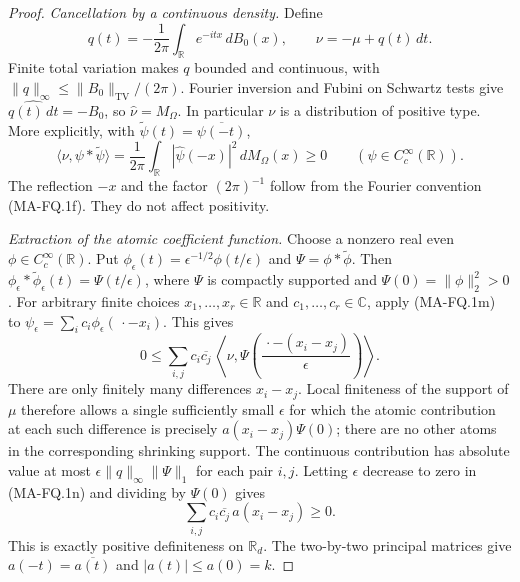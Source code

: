 \begin{proof}
\emph{Cancellation by a continuous density.}
Define
\[
 q(t)=-\frac1{2\pi}\int_{\mathbb R}e^{-itx}\,dB_0(x),
 \qquad \nu=-\mu+q(t)\,dt.
 \tag{MA-FQ.1l}
\]
Finite total variation makes $q$ bounded and continuous, with
$\|q\|_\infty\le\|B_0\|_{\mathrm{TV}}/(2\pi)$.
Fourier inversion and Fubini on Schwartz tests give
$\widehat{q(t)\,dt}=-B_0$, so
$\widehat\nu=M_\Omega$. In particular $\nu$ is a distribution
of positive type. More explicitly, with
$\widetilde\psi(t)=\overline{\psi(-t)}$,
\[
 \langle\nu,\psi*\widetilde\psi\rangle
   =\frac1{2\pi}\int_{\mathbb R}
                         |\widehat\psi(-x)|^2\,dM_\Omega(x)
   \ge0\qquad(\psi\in C_c^\infty(\mathbb R)).
 \tag{MA-FQ.1m}
\]
The reflection $-x$ and the factor $(2\pi)^{-1}$ follow from
the Fourier convention (MA-FQ.1f). They do not affect positivity.

\emph{Extraction of the atomic coefficient function.}
Choose a nonzero real even $\phi\in C_c^\infty(\mathbb R)$.
Put $\phi_\epsilon(t)=\epsilon^{-1/2}\phi(t/\epsilon)$ and
$\Psi=\phi*\widetilde\phi$. Then
$\phi_\epsilon*\widetilde\phi_\epsilon(t)=\Psi(t/\epsilon)$,
where $\Psi$ is compactly supported and
$\Psi(0)=\|\phi\|_2^2>0$. For arbitrary finite choices
$x_1,\ldots,x_r\in\mathbb R$ and $c_1,\ldots,c_r\in\mathbb C$,
apply (MA-FQ.1m) to
$\psi_\epsilon=\sum_i c_i\phi_\epsilon(\,\cdot-x_i)$.
This gives
\[
 0\le\sum_{i,j}c_i\overline{c_j}\,
 \left\langle\nu,
  \Psi\left(\frac{\,\cdot-(x_i-x_j)}\epsilon\right)
 \right\rangle.
 \tag{MA-FQ.1n}
\]
There are only finitely many differences $x_i-x_j$.
Local finiteness of the support of $\mu$ therefore allows a
single sufficiently small $\epsilon$ for which the atomic
contribution at each such difference is precisely
$a(x_i-x_j)\Psi(0)$; there are no other atoms in the
corresponding shrinking support. The continuous contribution
has absolute value at most
$\epsilon\|q\|_\infty\|\Psi\|_1$ for each pair $i,j$.
Letting $\epsilon$ decrease to zero in (MA-FQ.1n) and dividing
by $\Psi(0)$ gives
\[
       \sum_{i,j}c_i\overline{c_j}\,a(x_i-x_j)\ge0.
 \tag{MA-FQ.1o}
\]
This is exactly positive definiteness on $\mathbb R_d$.
The two-by-two principal matrices give
$a(-t)=\overline{a(t)}$ and $|a(t)|\le a(0)=k$.


\end{proof}
